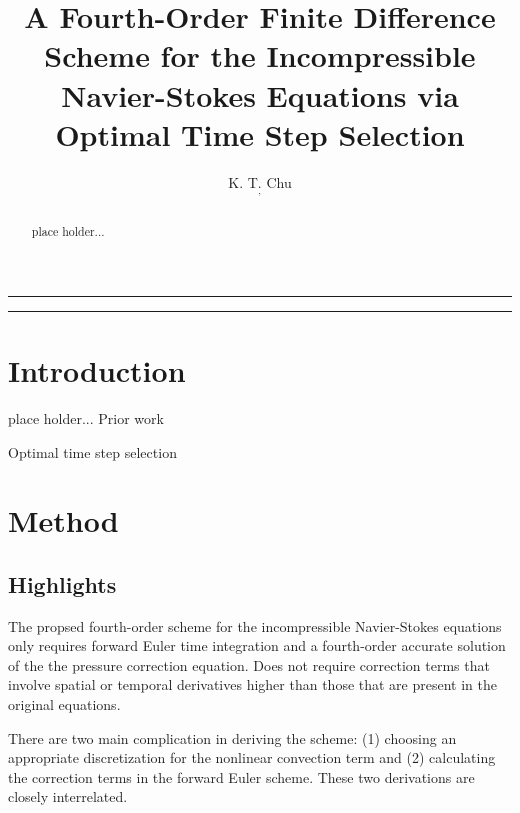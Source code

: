\documentclass[fleqn,12pt,twoside]{article}
\begin{document}


\title{A Fourth-Order Finite Difference Scheme for the 
Incompressible Navier-Stokes Equations via Optimal Time Step Selection}

\author{
K. T. Chu\address{Vitamin D, Inc., Menlo Park, CA 94025}$^,$\address[IHPC]{Institute of High Performance Computing, A*STAR, Singapore, Singapore}
}


\maketitle

\noindent \rule{6.3in}{1pt}

\begin{abstract}
place holder...
\end{abstract}

\noindent \rule{6.3in}{1pt}


\section{Introduction}
place holder...
Prior work~\cite{bruger_2005,shukla_2007}

Optimal time step selection~\cite{chu_2009}


\section{Method}

\subsection{Highlights}
The propsed fourth-order scheme for the incompressible Navier-Stokes equations
only requires forward Euler time integration and a fourth-order accurate
solution of the the pressure correction equation.  Does not require 
correction terms that involve spatial or temporal derivatives higher than
those that are present in the original equations.

There are two main complication in deriving the scheme:
(1) choosing an appropriate discretization for the nonlinear convection
term and 
(2) calculating the correction terms in the forward Euler scheme.  These
two derivations are closely interrelated.
\end{document}

